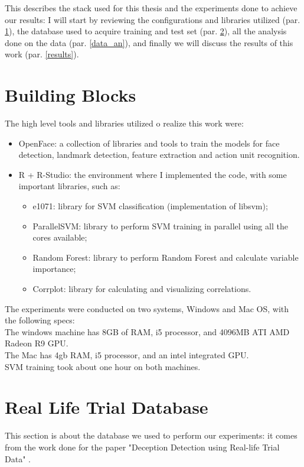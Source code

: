 This describes the stack used for this thesis and the experiments done to achieve our results: I will start by reviewing the configurations and libraries utilized (par. \ref{bb}), the database used to acquire training and test set (par. \ref{rldb}), all the analysis done on the data (par. \ref{data_an}), and finally we will discuss the results of this work (par. \ref{results}).

\section{Building Blocks} \label{bb}
The high level tools and libraries utilized o realize this work were:
\begin{itemize}
	\item OpenFace: a collection of libraries and tools to train the models for face detection, landmark detection, feature extraction and action unit recognition.
	\item R + R-Studio: the environment where I implemented the code, with some important libraries, such as:
	\begin{itemize}
		\item e1071: library for SVM classification (implementation of libsvm);
		\item ParallelSVM: library to perform SVM training in parallel using all the cores available;
		\item Random Forest: library to perform Random Forest and calculate variable importance;
		\item Corrplot: library for calculating and visualizing correlations.
	\end{itemize}
\end{itemize}

The experiments were conducted on two systems, Windows and Mac OS, with the following specs:\\
The windows machine has 8GB of RAM, i5 processor, and 4096MB ATI AMD Radeon R9 GPU. \\
The Mac has 4gb RAM, i5 processor, and an intel integrated GPU.\\
SVM training took about one hour on both machines.

\clearpage
\section{Real Life Trial Database} \label{rldb}
This section is about the database we used to perform our experiments: it comes from the work done for the paper "Deception Detection using Real-life Trial Data" \cite{Perez-Rosas:2015:DDU:2818346.2820758}.

